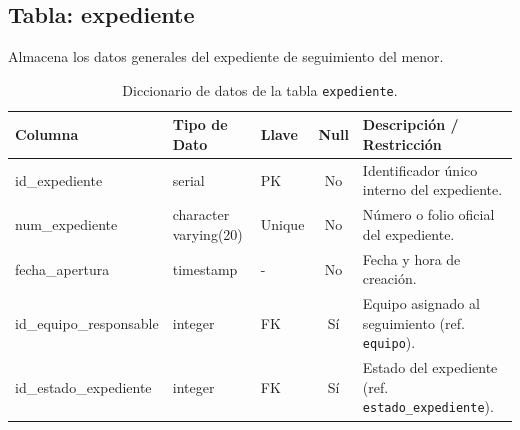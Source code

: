 \subsection{Tabla: expediente}
Almacena los datos generales del expediente de seguimiento del menor.
\begin{table}[htbp!]
\centering
\begin{tabular}{|l|l|l|c|l|}
\hline
\textbf{Columna} & \textbf{Tipo de Dato} & \textbf{Llave} & \textbf{Null} & \textbf{Descripción / Restricción} \\
\hline
id\_expediente & serial & PK & No & Identificador único interno del expediente. \\
num\_expediente & character varying(20) & Unique & No & Número o folio oficial del expediente. \\
fecha\_apertura & timestamp & - & No & Fecha y hora de creación. \\
id\_equipo\_responsable & integer & FK & Sí & Equipo asignado al seguimiento (ref. \texttt{equipo}). \\
id\_estado\_expediente & integer & FK & Sí & Estado del expediente (ref. \texttt{estado\_expediente}). \\
\hline
\end{tabular}
\caption{Diccionario de datos de la tabla \texttt{expediente}.}
\label{tbl:diccionarioExpediente}
\end{table}

